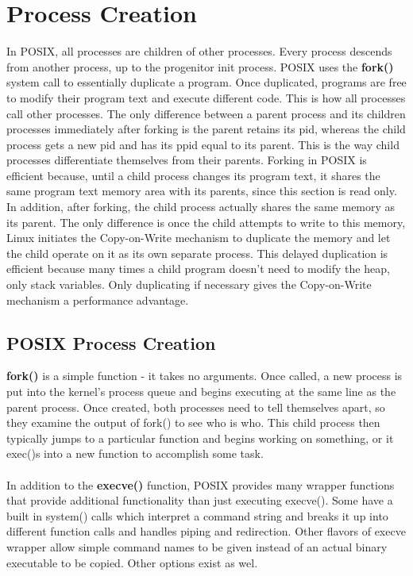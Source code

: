 \documentclass[11pt]{article}
\begin{document}
\section{Process Creation}
In POSIX, all processes are children of other processes. Every process descends from another process, up to the progenitor init process. POSIX uses the \textbf{fork()} system call to essentially duplicate a program. Once duplicated, programs are free to modify their program text and execute different code. This is how all processes call other processes. The only difference between a parent process and its children processes immediately after forking is the parent retains its pid, whereas the child process gets a new pid and has its ppid equal to its parent. This is the way child processes differentiate themselves from their parents. Forking in POSIX is efficient because, until a child process changes its program text, it shares the same program text memory area with its parents, since this section is read only. In addition, after forking, the child process actually shares the same memory as its parent. The only difference is once the child attempts to write to this memory, Linux initiates the Copy-on-Write mechanism to duplicate the memory and let the child operate on it as its own separate process. This delayed duplication is efficient because many times a child program doesn't need to modify the heap, only stack variables. Only duplicating if necessary gives the Copy-on-Write mechanism a performance advantage. \\

\subsection{POSIX Process Creation}
\textbf{fork()} is a simple function - it takes no arguments. Once called, a new process is put into the kernel's process queue and begins executing at the same line as the parent process. Once created, both processes need to tell themselves apart, so they examine the output of fork() to see who is who. This child process then typically jumps to a particular function and begins working on something, or it exec()s into a new function to accomplish some task. \\ \\

In addition to the \textbf{execve()} function, POSIX provides many wrapper functions that provide additional functionality than just executing execve(). Some have a built in system() calls which interpret a command string and breaks it up into different function calls and handles piping and redirection. Other flavors of execve wrapper allow simple command names to be given instead of an actual binary executable to be copied. Other options exist as wel. \\ \\
\end{document}
